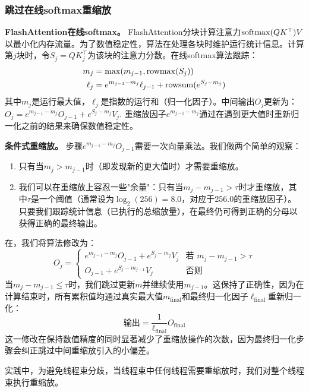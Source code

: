 \subsubsection{跳过在线softmax重缩放}

\textbf{FlashAttention在线softmax。}
FlashAttention分块计算注意力$\mathrm{softmax}(QK^\top)V$以最小化内存流量。为了数值稳定性，算法在处理各块时维护运行统计信息。计算第$j$块时，令$S_j = Q K_j^\top$为该块的注意力分数。在线softmax算法跟踪：
\begin{align*}
m_j &= \mathrm{max}(m_{j-1}, \mathrm{rowmax}(S_j)) \\
\ell_j &= e^{m_{j-1} - m_j} \ell_{j-1} + \mathrm{rowsum}(e^{S_j - m_j})
\end{align*}
其中$m_j$是运行最大值，$\ell_j$是指数的运行和（归一化因子）。中间输出$O_j$更新为：
$
O_j = e^{m_{j-1} - m_j} O_{j-1} + e^{S_j - m_j} V_j.
$
重缩放因子$e^{m_{j-1} - m_j}$通过在遇到更大值时重新归一化之前的结果来确保数值稳定性。

\textbf{条件式重缩放。}
步骤$e^{m_{j-1} - m_j} O_{j-1}$需要一次向量乘法。我们做两个简单的观察：
\begin{enumerate}
\item 只有当$m_j > m_{j-1}$时（即发现新的更大值时）才需要重缩放。
\item 我们可以在重缩放上容忍一些"余量"：只有当$m_j - m_{j-1} > \tau$时才重缩放，其中$\tau$是一个阈值（通常设为$\log_2(256) = 8.0$，对应于256.0的重缩放因子）。只要我们跟踪统计信息（已执行的总缩放量），在最终仍可得到正确的分母以获得正确的最终输出。
\end{enumerate}

在，我们将算法修改为：
\begin{equation}
O_j = \begin{cases}
e^{m_{j-1} - m_j} O_{j-1} + e^{S_j - m_j} V_j & \text{若 } m_j - m_{j-1} > \tau \\
O_{j-1} + e^{S_j - m_{j-1}} V_j & \text{否则}
\end{cases}
\end{equation}
当$m_j - m_{j-1} \leq \tau$时，我们跳过更新$m$并继续使用$m_{j-1}$。这保持了正确性，因为在计算结束时，所有累积值均通过真实最大值$m_{\text{final}}$和最终归一化因子$\ell_{\text{final}}$重新归一化：
{\setlength{\abovedisplayskip}{0.1pt}%
 \setlength{\belowdisplayskip}{1pt}%
 \setlength{\abovedisplayshortskip}{0.1pt}%
 \setlength{\belowdisplayshortskip}{1pt}%
\begin{equation*}
\text{输出} = \frac{1}{\ell_{\text{final}}} O_{\text{final}}
\end{equation*}}
这一修改在保持数值精度的同时显著减少了重缩放操作的次数，因为最终归一化步骤会纠正跳过中间重缩放引入的小偏差。

实践中，为避免线程束分歧，当线程束中任何线程需要重缩放时，我们对整个线程束执行重缩放。
